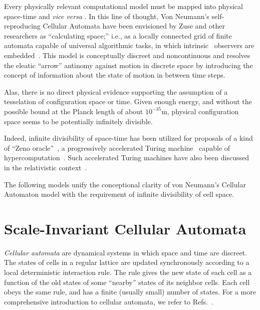 \documentclass[pre,amssymb,showpacs,showkeys,preprint]{revtex4}
\begin{document}
Every physically relevant computational model must be mapped into physical space-time and {\it vice versa}
\cite{landauer-89,maxwell-demon,bennett-73}.
In this line of thought, Von Neumann's self-reproducing Cellular Automata \cite{v-neumann-66}
have been envisioned by Zuse \cite{zuse-67,zuse-69,zuse-94,zuse-70}
and other researchers  \cite{fredkin,toffoli-margolus-90,wolfram-2002}
as  ``calculating space;''
i.e., as a
locally connected grid of finite automata \cite{hopcroft}
capable of universal algorithmic tasks, in which
intrinsic~\cite{svozil-94} observers are embedded~\cite{toffoli:79}.
This model is conceptually discreet and
noncontinuous and resolves the eleatic ``arrow''
antinomy \cite{zeno,ki-57,gruenbaum:68,sv-aut-rev}
against motion in discrete space by introducing
the concept of information about the state of motion in between time steps.

Alas,  there is no direct physical evidence supporting  the assumption of a tesselation of configuration space or time.
Given enough energy, and without the possible bound at the Planck length of about $10^{-35}$m, physical configuration space seems
to be potentially infinitely divisible.

Indeed, infinite divisibility of space-time has been utilized for proposals of a kind of ``Zeno oracle''~\cite{weyl:49},
a progressively accelerated Turing machine~\cite{gruenbaum:74,svozil98,rucker,Davies01,ord-2006}
capable of hypercomputation~\cite{Davis-2004,Doria-2006,Davis-2006}.
Such accelerated Turing machines have also been discussed in the relativistic context~\cite{thom:54,benna:62,pit:90,ear-nor:93,hogarth1,hogarth2,beth-59,le-91}.

The following models unify the conceptional clarity of
von Neumann's Cellular Automaton model with the
requirement of infinite divisibility of cell space.

\section{Scale-Invariant Cellular Automata}
\label{chap:sica}

\emph{Cellular automata} are dynamical systems in which space and time are discreet.
The states of cells in a regular lattice are updated synchronously according to a local deterministic
interaction rule.
The rule gives the new state of each cell as a function of the old states of some ``nearby'' states of its neighbor cells.
Each cell obeys the same rule, and has a finite (usually small) number of states.
For a more comprehensive introduction to cellular automata, we refer to Refs.~\cite{v-neumann-66,wolfram-86,gutowitz,ilachinski01,wolfram-2002}.
\end{document}
